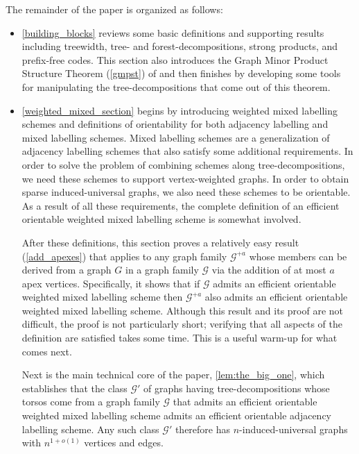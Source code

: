 \documentclass{patmorin}
\newcommand{\calG}{\mathcal{G}}
\begin{document}
The remainder of the paper is organized as follows:  
\begin{itemize}
\item \cref{building_blocks} reviews some basic definitions and supporting results including treewidth, tree- and forest-decompositions, strong products, and prefix-free codes. This section also introduces the Graph Minor Product Structure Theorem (\cref{gmpst}) of \citet{dujmovic.joret.ea:planar} and then finishes by developing some tools for manipulating the tree-decompositions that come out of this theorem.
 \item \cref{weighted_mixed_section} begins by introducing weighted mixed labelling schemes and definitions of orientability for both adjacency labelling and mixed labelling schemes.  Mixed labelling schemes are a generalization of adjacency labelling schemes that also satisfy some additional requirements. In order to solve the problem of combining schemes along tree-decompositions, we need these schemes to support vertex-weighted graphs.  In order to obtain sparse induced-universal graphs, we also need these schemes to be orientable.  As a result of all these requirements, the complete definition of an efficient orientable weighted mixed labelling scheme is somewhat involved.  

After these definitions, this section proves a relatively easy result (\cref{add_apexes}) that applies to any graph family $\calG^{+a}$ whose members can be derived from a graph $G$ in a graph family $\calG$ via the addition of at most $a$ apex vertices.  Specifically, it shows that if $\calG$ admits an efficient orientable weighted mixed labelling scheme then $\calG^{+a}$ also admits an efficient orientable weighted mixed labelling scheme.  Although this result and its proof are not difficult, the proof is not particularly short; verifying that all aspects of the definition are satisfied takes some time.  This is a useful warm-up for what comes next.

Next is the main technical core of the paper, \cref{lem:the_big_one}, which establishes that the class $\calG'$ of graphs having tree-decompositions whose torsos come from a graph family $\calG$ that admits an efficient orientable weighted mixed labelling scheme admits an efficient orientable adjacency labelling scheme. Any such class $\calG'$ therefore has $n$-induced-universal graphs with $n^{1+o(1)}$ vertices and edges.  


\end{itemize}
\end{document}
